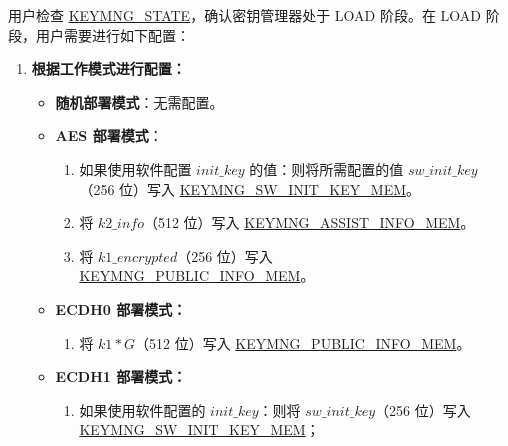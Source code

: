 \documentclass[main\_\_CN.tex]{subfiles}
\begin{document}
用户检查 \hyperref[fielddesc:KEYMNGSTATE]{KEYMNG\_STATE}，确认密钥管理器处于 LOAD 阶段。在 LOAD 阶段，用户需要进行如下配置：
\begin{enumerate}
    \item \textbf{根据工作模式进行配置：}
    \begin{itemize}
        \item \textbf{随机部署模式}：无需配置。
        \item \textbf{AES 部署模式}： 
        \begin{enumerate}
            \item 如果使用软件配置 \hyperref[para:initkey]{\begin{math}init\_key\end{math}} 的值：则将所需配置的值 \begin{math}sw\_init\_key\end{math}（256 位）写入 \hyperref[mem:keymng-sw-init-key]{KEYMNG\_SW\_INIT\_KEY\_MEM}。
            \item 将 \hyperref[para:k2info]{\begin{math}k2\_info\end{math}}（512 位）写入 \hyperref[mem:keymng-assist-info]{KEYMNG\_ASSIST\_INFO\_MEM}。
            \item 将 \hyperref[para:k1enc]{\begin{math}k1\_encrypted\end{math}}（256 位）写入 \hyperref[mem:keymng-public-info]{KEYMNG\_PUBLIC\_INFO\_MEM}。
        \end{enumerate}
        \item \textbf{ECDH0 部署模式：}
        \begin{enumerate}
            \item 将 \hyperref[para:k1G]{\begin{math}k1*G\end{math}}（512 位）写入 \hyperref[mem:keymng-public-info]{KEYMNG\_PUBLIC\_INFO\_MEM}。
        \end{enumerate}
        \item \textbf{ECDH1 部署模式：}
        \begin{enumerate}
            \item 如果使用软件配置的 \hyperref[para:initkey]{\begin{math}init\_key\end{math}}：则将 \begin{math}sw\_init\_key\end{math}（256 位）写入 \hyperref[mem:keymng-sw-init-key]{KEYMNG\_SW\_INIT\_KEY\_MEM}；

\end{enumerate}
\end{itemize}
\end{enumerate}
\end{document}
